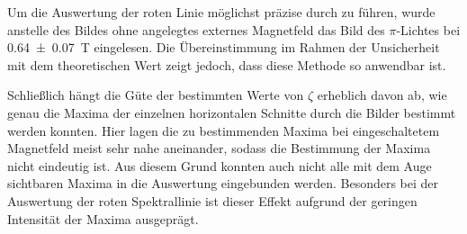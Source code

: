 Um die Auswertung der roten Linie möglichst präzise durch zu führen, wurde anstelle
des Bildes ohne angelegtes externes Magnetfeld das Bild des $\pi$-Lichtes bei
\SI{0.64(7)}{\tesla} eingelesen. Die Übereinstimmung im Rahmen der Unsicherheit mit
dem theoretischen Wert zeigt jedoch, dass diese Methode so anwendbar ist.

Schließlich hängt die Güte der bestimmten Werte von $\zeta$ erheblich davon ab, wie
genau die Maxima der einzelnen horizontalen Schnitte durch die Bilder bestimmt werden
konnten. Hier lagen die zu bestimmenden Maxima bei eingeschaltetem Magnetfeld
meist sehr nahe aneinander, sodass die Bestimmung der Maxima nicht eindeutig ist.
Aus diesem Grund konnten auch nicht alle mit dem Auge sichtbaren Maxima in die
Auswertung eingebunden werden. Besonders bei der Auswertung der roten
Spektrallinie ist dieser Effekt aufgrund der geringen Intensität der Maxima
ausgeprägt.
